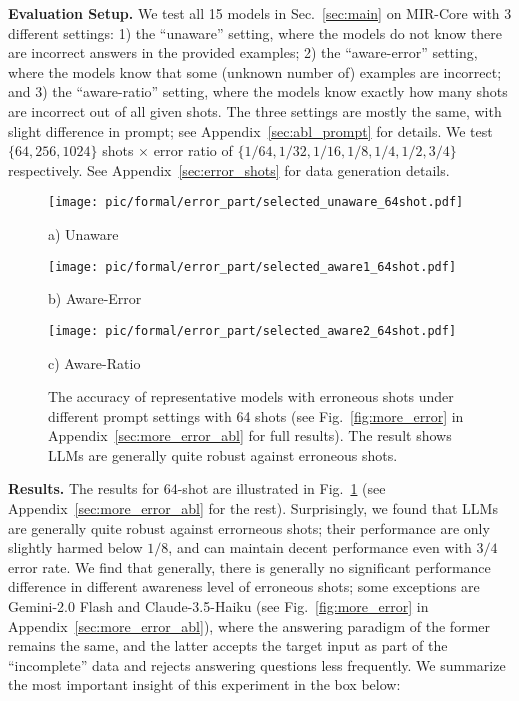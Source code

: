 \textbf{Evaluation Setup.} We test all 15 models in Sec.~\ref{sec:main} on MIR-Core with $3$ different settings: 1) the ``unaware'' setting, where the models do not know there are incorrect answers in the provided examples; 2) the ``aware-error'' setting, where the models know that some (unknown number of) examples are incorrect; and 3) the ``aware-ratio'' setting, where the models know exactly how many shots are incorrect out of all given shots. The three settings are mostly the same, with slight difference in prompt; see Appendix~\ref{sec:abl_prompt} for details. We test $\{64, 256, 1024\}$ shots $\times$ error ratio of $\{1/64, 1/32, 1/16, 1/8, 1/4, 1/2, 3/4\}$ respectively. See Appendix~\ref{sec:error_shots} for data generation details.

\begin{figure*}[ht]
    \centering
    \begin{minipage}[t]{0.28\textwidth}
        \centering
        \texttt{[image: pic/formal/error\_part/selected\_unaware\_64shot.pdf]}
        \caption*{a) Unaware}
    \end{minipage}
    \hfill
    \begin{minipage}[t]{0.28\textwidth}
        \centering
        \texttt{[image: pic/formal/error\_part/selected\_aware1\_64shot.pdf]}
        \caption*{b) Aware-Error}
    \end{minipage}
    \hfill
    \begin{minipage}[t]{0.4\textwidth}
        \centering
        \texttt{[image: pic/formal/error\_part/selected\_aware2\_64shot.pdf]}
        \caption*{c) Aware-Ratio}
    \end{minipage}
    
    \caption{The accuracy of representative models with erroneous shots under different prompt settings with 64 shots (see Fig.~\ref{fig:more_error} in Appendix~\ref{sec:more_error_abl} for full results). The result shows LLMs are generally quite robust against erroneous shots.}
    \label{fig:error}
\end{figure*}

\textbf{Results.} The results for $64$-shot are illustrated in Fig.~\ref{fig:error} (see Appendix~\ref{sec:more_error_abl} for the rest). Surprisingly, we found that LLMs are generally quite robust against errorneous shots; their performance are only slightly harmed below $1/8$, and can maintain decent performance even with $3/4$ error rate. We find that generally, there is generally no significant performance difference in different awareness level of erroneous shots; some exceptions are Gemini-2.0 Flash and Claude-3.5-Haiku (see Fig.~\ref{fig:more_error} in Appendix~\ref{sec:more_error_abl}), where the answering paradigm of the former remains the same, and the latter accepts the target input as part of the ``incomplete'' data and rejects answering questions less frequently. We summarize the most important insight of this experiment in the box below:



